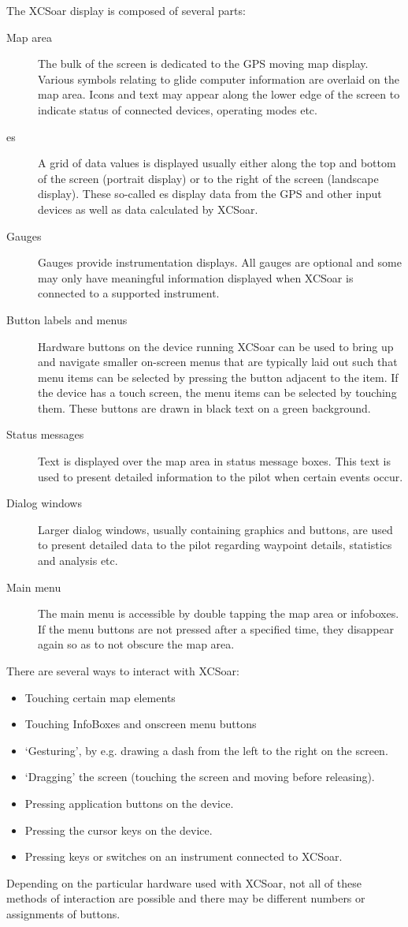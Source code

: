 \documentclass[a4paper,12pt]{refrep}
\begin{document}
The XCSoar display is composed of several parts:
\begin{description}
\item[Map area] The bulk of the screen is dedicated to the GPS moving map
display. Various symbols relating to glide computer information are overlaid 
on the map area. Icons and text may appear along the lower edge of the screen
to indicate status of connected devices, operating modes etc.
\item[{\InfoBox}es] A grid of data values is displayed usually either along
the top and bottom of the screen (portrait display) or to the right of the
screen (landscape display).  These so-called {\InfoBox}es display data from the
GPS and other input devices as well as data calculated by XCSoar.
\item[Gauges]  Gauges provide instrumentation displays. All gauges are optional
and some may only have meaningful information displayed when XCSoar is
connected to a supported instrument.
\item[Button labels and menus] Hardware buttons on the device running XCSoar
can be used to bring up and navigate smaller on-screen menus that are
typically laid out such that menu items can be selected by pressing the
button adjacent to the item.  If the device has a touch screen, the menu
items can be selected by touching them.  These buttons are drawn in black
text on a green background.
\item[Status messages] Text is displayed over the map area in status message
boxes.  This text is used to present detailed information to the pilot when
certain events occur.
\item[Dialog windows] Larger dialog windows, usually containing graphics and
buttons, are used to present detailed data to the pilot regarding waypoint
details, statistics and analysis etc.
\item[Main menu] The main menu is accessible by double tapping the map area or
infoboxes. If the menu buttons are not pressed after a specified time, they 
disappear again so as to not obscure the map area.
\end{description}

There are several ways to interact with XCSoar:
\begin{itemize}
\item Touching certain map elements
\item Touching InfoBoxes and onscreen menu buttons
\item `Gesturing', by e.g. drawing a dash from the left to the right on the screen.
\item `Dragging' the screen (touching the screen and moving before releasing).
\item Pressing application buttons on the device.
\item Pressing the cursor keys on the device.
\item Pressing keys or switches on an instrument connected to XCSoar.
\end{itemize}
Depending on the particular hardware used with XCSoar, not all of these methods
of interaction are possible and there may be different numbers or assignments
of buttons.
\end{document}
